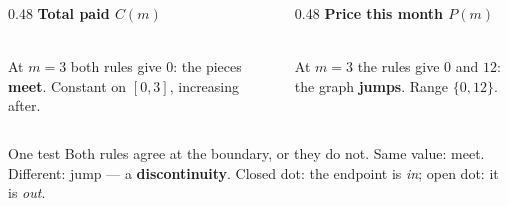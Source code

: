 \documentclass[aspectratio=169, 11pt]{beamer}
\newcommand{\mgrid}{%
  \draw[step=1, linegray!40, very thin] (0,0) grid (7,4);
  \draw[->, thick, charcoal] (0,0)--(7.6,0) node[below right, font=\tiny]{$m$};
  \draw[->, thick, charcoal] (0,0)--(0,4.6) node[left, font=\tiny]{\$};
  \foreach \x in {1,...,7}{\node[below, font=\tiny, charcoal] at (\x,0){$\x$};}
  \foreach \y/\lab in {1/12,2/24,3/36,4/48}{\node[left, font=\tiny, charcoal] at (0,\y){$\lab$};}}
\newcommand{\fdot}[3]{\fill[#1] (#2,#3) circle (3.2pt);}
\newcommand{\hdot}[3]{\draw[very thick, #1, fill=white] (#2,#3) circle (3.2pt);}
\begin{document}
\begin{frame}[t, plain]
  \begin{columns}[T]
    \begin{column}{0.48\textwidth}
      \textbf{Total paid $C(m)$} \\[2pt]
      \centering
       \\[2pt]
      At $m=3$ both rules give $0$: the pieces \textbf{meet}. Constant on $[0,3]$, increasing after.
    \end{column}
    \begin{column}{0.48\textwidth}
      \textbf{Price this month $P(m)$} \\[2pt]
      \centering
       \\[2pt]
      At $m=3$ the rules give $0$ and $12$: the graph \textbf{jumps}. Range $\{0,12\}$.
    \end{column}
  \end{columns}
  \vspace{3pt}
  \begin{block}{One test}
    Both rules agree at the boundary, or they do not. Same value: meet. Different: jump --- a
    \textbf{discontinuity}. Closed dot: the endpoint is \emph{in}; open dot: it is \emph{out}.
  \end{block}
\end{frame}
\end{document}
